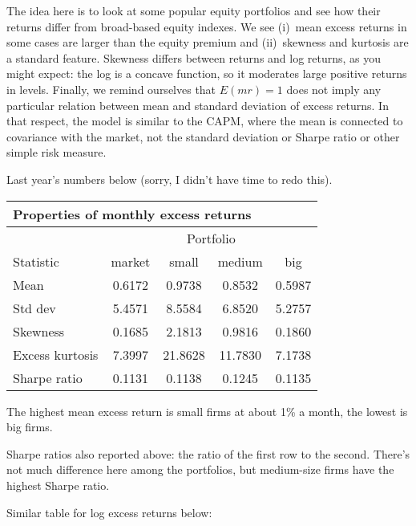 \documentclass[11pt]{exam}
\begin{document}
\begin{questions}
\begin{solution}
The idea here is to look at some popular equity portfolios
and see how their returns differ from broad-based equity indexes.
We see (i)~mean excess returns in some cases are larger than the equity premium
and (ii)~skewness and kurtosis are a standard feature.
Skewness differs between returns and log returns, as you might expect:
the log is a concave function, so it moderates large positive returns in levels.
Finally, we remind ourselves that $ E(mr) = 1$ does not imply
any particular relation between mean and standard deviation of excess returns.
In that respect, the model is similar to the CAPM, where the mean is connected to
covariance with the market, not the standard deviation or Sharpe ratio
or other simple risk measure.

\begin{parts}
\item Last year's numbers below (sorry, I didn't have time to redo this).

\medskip
\begin{center}
\begin{tabular}{lcccc}
\multicolumn{4}{l}{Properties of monthly excess returns} \\
\toprule
            & \multicolumn{4}{c}{Portfolio} \\
                         \cmidrule{2-5}
Statistic   & market & small  & medium & big \\
\midrule
Mean &  0.6172 &  0.9738  &  0.8532  & 0.5987 \\
Std dev & 5.4571  &  8.5584  &  6.8520 &  5.2757 \\
Skewness &  0.1685 &   2.1813 &  0.9816  &  0.1860 \\
Excess kurtosis &  7.3997 &  21.8628 &  11.7830 &  7.1738 \\
Sharpe ratio  &  0.1131  &  0.1138  &  0.1245 &   0.1135 \\
\bottomrule
\end{tabular}
\end{center}

\medskip
The highest mean excess return is small firms at about 1\% a month,
the lowest is big firms.

\item Sharpe ratios also reported above:
the ratio of the first row to the second.
There's not much difference here among the portfolios,
but medium-size firms have the highest Sharpe ratio.

\item Similar table for log excess returns below:


\end{parts}
\end{solution}
\end{questions}
\end{document}
